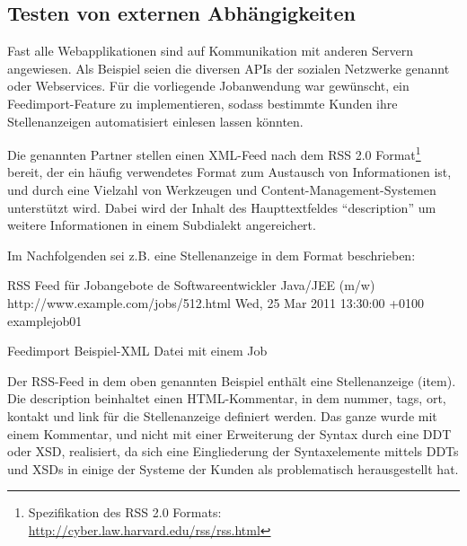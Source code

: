 \subsection{Testen von externen Abhängigkeiten}
\label{sec:awmock}
Fast alle Webapplikationen sind auf Kommunikation mit anderen Servern angewiesen. Als Beispiel seien die diversen APIs der sozialen Netzwerke genannt oder Webservices. Für die vorliegende Jobanwendung war gewünscht, ein Feedimport-Feature zu implementieren, sodass bestimmte Kunden ihre Stellenanzeigen automatisiert einlesen lassen könnten.

Die genannten Partner stellen einen XML-Feed nach dem RSS 2.0 Format\footnote{Spezifikation des RSS 2.0 Formats: \url{http://cyber.law.harvard.edu/rss/rss.html}} bereit, der ein häufig verwendetes Format zum Austausch von Informationen ist, und durch eine Vielzahl von Werkzeugen und Content-Management-Systemen unterstützt wird.
Dabei wird der Inhalt des Haupttextfeldes "`description"' um weitere Informationen in einem Subdialekt angereichert. 
 
Im Nachfolgenden sei z.B. eine Stellenanzeige in dem Format beschrieben:

\begin{ruby}[label=beispiel\_job.xml, fontsize=\relsize{-2}]
 
    RSS Feed für Jobangebote 
    de
      Softwareentwickler Java/JEE (m/w)
        \PY{c+cp}{<![CDATA[}
\PY{c+cp}{        ]]>}
      http://www.example.com/jobs/512.html
      Wed, 25 Mar 2011 13:30:00 +0100
      example\PYZus{}job\PYZus{}01
\end{ruby}
\captionsetup{type=lstlisting}
\caption{Feedimport Beispiel-XML Datei mit einem Job}
Der RSS-Feed in dem oben genannten Beispiel enthält eine Stellenanzeige (item). Die description beinhaltet einen HTML-Kommentar, in dem nummer, tags, ort, kontakt und link für die Stellenanzeige definiert werden. Das ganze wurde mit einem Kommentar, und nicht mit einer Erweiterung der Syntax durch eine DDT oder XSD, realisiert, da sich eine Eingliederung der Syntaxelemente mittels DDTs und XSDs in einige der Systeme der Kunden als problematisch herausgestellt hat.

